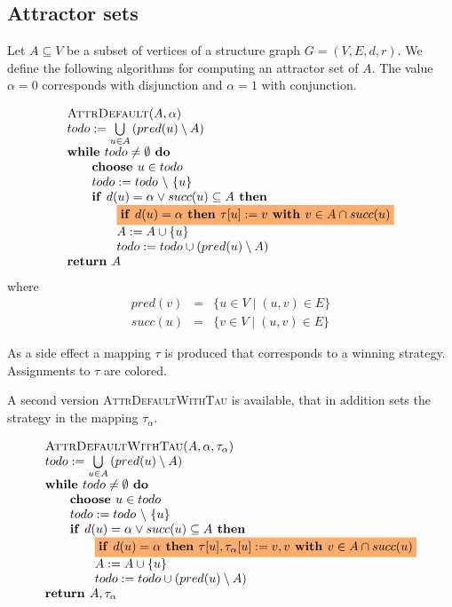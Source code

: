 \documentclass{article}
\newcommand{\If}{\text{\textbf{if }}}
\newcommand{\Do}{\text{\textbf{ do }}}
\newcommand{\Then}{\text{\textbf{ then }}}
\newcommand{\While}{\text{\textbf{while }}}
\newcommand{\Choose}{\text{\textbf{choose }}}
\newcommand{\Return}{\text{\textbf{return }}}
\newcommand{\With}{\text{\textbf{ with }}}
\begin{document}
\subsection{Attractor sets}
Let $A \subseteq V$ be a subset of vertices of a structure graph $G=(V,E,d,r)$. We
define the following algorithms for computing an attractor set of $A$. The value
$\alpha = 0$ corresponds with disjunction and $\alpha = 1$ with conjunction.

\begin{equation*}
\begin{array}{l}
\textsc{AttrDefault}(A,\alpha) \\ 
todo:=\bigcup\limits_{u\in A}\left( pred(u)\setminus A\right)  \\ 
\While todo\neq \emptyset \Do \\ 
\qquad \Choose u\in todo \\ 
\qquad todo:=todo\ \backslash \ \{u\} \\ 
\qquad \If d(u) = \alpha \vee succ(u)\subseteq A \Then \\ 
\qquad \qquad \colorbox{Apricot}{$ \If d(u) = \alpha \Then \tau
\lbrack u]:=v\With v\in A\cap succ(u) $}\\ 
\qquad \qquad A:=A\cup \{u\} \\ 
\qquad \qquad todo:=todo\cup \left( pred(u)\setminus A\right)  \\ 
\Return A
\end{array}
\end{equation*}
where
\begin{eqnarray*}
pred(v) &=&\{u\in V\mid (u,v)\in E\} \\
succ(u) &=&\{v\in V\mid (u,v)\in E\}
\end{eqnarray*}%

As a side effect a mapping $\tau$ is produced that corresponds to a winning
strategy. Assignments to $\tau$ are \colorbox{Apricot}{colored}.

A second version \textsc{AttrDefaultWithTau} is available, that in addition
sets the strategy in the mapping $\tau_\alpha$.

\begin{equation*}
\begin{array}{l}
\textsc{AttrDefaultWithTau}(A,\alpha,\tau_\alpha) \\ 
todo:=\bigcup\limits_{u\in A}\left( pred(u)\setminus A\right)  \\ 
\While todo\neq \emptyset \Do \\ 
\qquad \Choose u\in todo \\ 
\qquad todo:=todo\ \backslash \ \{u\} \\ 
\qquad \If d(u) = \alpha \vee succ(u)\subseteq A \Then \\ 
\qquad \qquad \colorbox{Apricot}{$ \If d(u) = \alpha \Then
\tau[u], \tau_\alpha[u] := v, v \With v\in A\cap succ(u) $}\\ 
\qquad \qquad A:=A\cup \{u\} \\ 
\qquad \qquad todo:=todo\cup \left( pred(u)\setminus A\right)  \\ 
\Return A, \tau_\alpha
\end{array}
\end{equation*}
\end{document}
